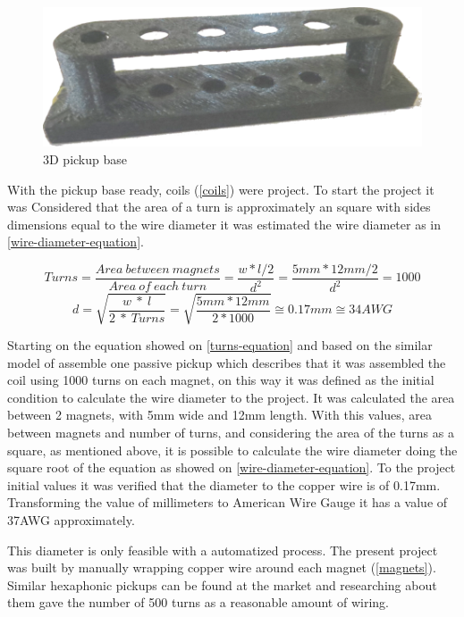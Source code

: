 \begin{figure}[!htpb]
\centering
\caption{3D pickup base}
\label{3D-base}
\includegraphics[scale=0.08]{images/base}
\end{figure}

With the pickup base ready, coils (\autoref{coils}) were project. To start the project it was
Considered that the area of a turn is approximately an square with sides dimensions
equal to the wire diameter it was estimated the wire diameter as in \autoref{wire-diameter-equation}.

\begin{equation}
  \label{turns-equation}
  Turns = \frac{Area\ between\ magnets}{Area\ of\ each\ turn} = \frac{ w * l / 2 }{ d^{2} } = \frac{5mm * 12mm / 2}{d^2} = 1000
\end{equation}
\begin{equation}
  \label{wire-diameter-equation}
  d = \sqrt{\frac{w\ *\ l}{2\ *\ Turns}} = \sqrt{\frac{5mm * 12mm}{2*1000}} \cong 0.17mm \cong 34AWG
\end{equation}

Starting on the equation showed on \autoref{turns-equation} and based on the similar model of assemble one
passive pickup \cite{hexaphonic-pickup} which describes that it was assembled the coil using 1000 turns on each magnet,
on this way it was defined as the initial condition to calculate the wire diameter to the project. It was calculated the
area between 2 magnets, with 5mm wide and 12mm length. With this values, area between magnets and number of turns, and
considering the area of the turns as a square, as mentioned above, it is possible to calculate the wire diameter doing the
square root of the equation as showed on \autoref{wire-diameter-equation}. To the project initial values it was verified
that the diameter to the copper wire is of 0.17mm. Transforming the value of millimeters to American Wire Gauge it has a
value of 37AWG approximately.

This diameter is only feasible with a automatized process. The present project was built by manually
wrapping copper wire around
each magnet (\autoref{magnets}). Similar hexaphonic pickups can be found at the
market and researching about them gave the number of 500 turns as a reasonable amount
of wiring. \\

